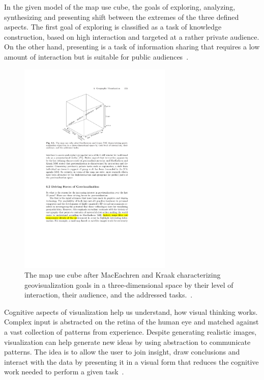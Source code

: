 In the given model of the map use cube, the goals of exploring, analyzing, synthesizing and presenting shift between the extremes of the three defined aspects. The first goal of exploring is classified as a task of knowledge construction, based on high interaction and targeted at a rather private audience. On the other hand, presenting is a task of information sharing that requires a low amount of interaction but is suitable for public audiences~\cite{noellenburg11geovis}.  

\begin{figure}[h]
  \begin{center}
    \includegraphics[width=0.65\textwidth]{figures/geovis_goals.pdf}
    \caption{The map use cube after MacEachren and Kraak \cite{MacEachren07cartovis} characterizing geovisualization goals in a three-dimensional space by their level of interaction, their audience, and the addressed tasks.~\cite{noellenburg11geovis}.}
    \label{fig:geovis-cube}
  \end{center}
\end{figure}


Cognitive aspects of visualization help us understand, how visual thinking works. Complex input is abstracted on the retina of the human eye and matched against a vast collection of patterns from experience. Despite generating realistic images, visualization can help generate new ideas by using abstraction to communicate patterns. The idea is to allow the user to join insight, draw conclusions and interact with the data by presenting it in a visual form that reduces the cognitive work needed to perform a given task~\cite{MACEACHREN90apattern, keim2001vis, noellenburg11geovis}. 

